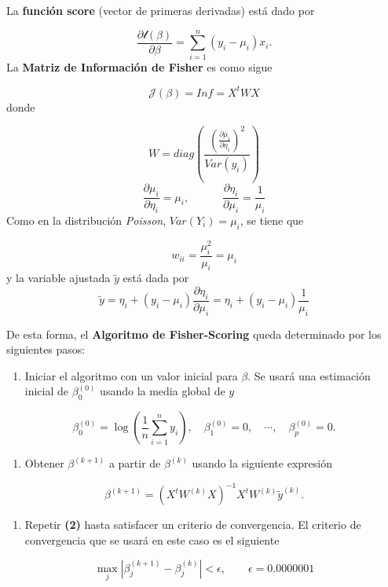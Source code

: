 \documentclass[
  letterpaper,
  DIV=11,
  numbers=noendperiod]{scrartcl}
\providecommand{\tightlist}{%
  \setlength{\itemsep}{0pt}\setlength{\parskip}{0pt}}\usepackage{longtable,booktabs,array}
\begin{document}
La \textbf{función score} (vector de primeras derivadas) está dado por

\[\frac{\partial \mathcal{l}(\beta)}{\partial \beta} = \sum_{i=1}^n (y_i - \mu_i)x_i.\]
La \textbf{Matriz de Información de Fisher} es como sigue

\[\mathcal{J}(\beta) = Inf = X^tWX\] donde

\[W = diag\left(\frac{\left(\frac{\partial \mu_i}{\partial \eta_i}\right)^2}{Var(y_i)}\right)\]
\[\frac{\partial \mu_i}{\partial \eta_i} = \mu_i, \quad \quad \quad \frac{\partial \eta_i}{\partial \mu_i} = \frac{1}{\mu_i}\]
Como en la distribución \emph{Poisson}, \(Var(Y_i) = \mu_i\), se tiene
que

\[w_{ii} = \frac{\mu_i^2}{\mu_i} =\mu_i\] y la variable ajustada
\(\widetilde{y}\) está dada por
\[\widetilde{y} = \eta_i + (y_i - \mu_i)\frac{\partial \eta_i}{\partial \mu_i} = \eta_i + (y_i - \mu_i)\frac{1}{\mu_i}\]

De esta forma, el \textbf{Algoritmo de Fisher-Scoring} queda determinado
por los siguientes pasos:

\begin{enumerate}
\def\labelenumi{\arabic{enumi})}
\tightlist
\item
  Iniciar el algoritmo con un valor inicial para \(\beta\). Se usará una
  estimación inicial de \(\beta_0^{(0)}\) usando la media global de
  \(y\)
\end{enumerate}

\[
\beta_0^{(0)} = \log\left(\frac{1}{n}\sum_{i=1}^n y_i\right), \quad
\beta_1^{(0)} = 0, \quad \cdots, \quad
\beta_p^{(0)} = 0.
\]

\begin{enumerate}
\def\labelenumi{\arabic{enumi})}
\setcounter{enumi}{1}
\tightlist
\item
  Obtener \(\beta^{(k+1)}\) a partir de \(\beta^{(k)}\) usando la
  siguiente expresión
\end{enumerate}

\[\beta^{(k+1)} = \left(X^tW^{(k)}X\right)^{-1}X^tW^{(k)}\widetilde{y}^{(k)}.\]

\begin{enumerate}
\def\labelenumi{\arabic{enumi})}
\setcounter{enumi}{2}
\tightlist
\item
  Repetir \textbf{(2)} hasta satisfacer un criterio de convergencia. El
  criterio de convergencia que se usará en este caso es el siguiente
\end{enumerate}

\[\max_j \left| \beta_j^{(k+1)} - \beta_j^{(k)} \right| < \epsilon, \quad \quad \epsilon=0.0000001\]
\end{document}
